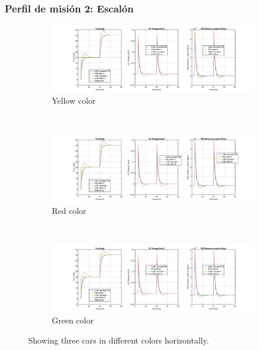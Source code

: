 

\subsubsection{Perfil de misión 2: Escalón}

\begin{figure}
	\centering
	\begin{subfigure}{1.2\linewidth}
		\includegraphics[width=\linewidth]{imagenes/resultados/Step/orbit_zero/Compilado.PNG}
		\caption{Yellow color}
		\label{fig:step_zero}
	\end{subfigure}\\
	\begin{subfigure}{1.2\linewidth}
		\includegraphics[width=\linewidth]{imagenes/resultados/Step/orbit_iss/Compilado.PNG}
		\caption{Red color}
		\label{fig:step_iss}
	\end{subfigure}\\
	\begin{subfigure}{1.2\linewidth}
		\includegraphics[width=\linewidth]{imagenes/resultados/Step/orbit_polar/Compilado.PNG}
		\caption{Green color}
		\label{fig:step_polar}
	\end{subfigure}
	\caption{Showing three cars in different colors horizontally.}
	\label{fig:step}
\end{figure}
 
